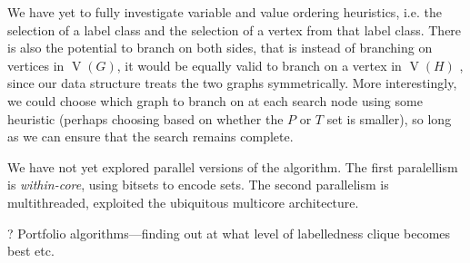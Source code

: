 \documentclass[letterpaper]{article}
\DeclareMathOperator{\V}{V}
\begin{document}
We have yet to fully investigate variable and value ordering heuristics, i.e. the selection of a label class and the selection of a vertex from that label class.
There is also the potential to branch on both sides, that is instead of branching on vertices in $\V(G)$, it would be equally valid to branch on
a vertex in $\V(H)$ , since our data structure treats the
two graphs symmetrically. More interestingly, we could choose which graph to branch on
at each search node using some heuristic (perhaps choosing based on whether the $P$ or
$T$ set is smaller), so long as we can ensure that the search remains complete.

We have not yet explored parallel versions of the algorithm. The first paralellism is \emph{within-core}, using bitsets to encode sets. The second parallelism  is  multithreaded,
exploited the ubiquitous multicore architecture.

? Portfolio algorithms---finding out at what level of labelledness clique becomes best etc.




\end{document}

